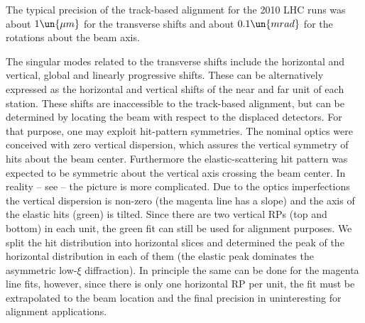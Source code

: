
The typical precision of the track-based alignment for the 2010 LHC runs was about $1\un{\mu m}$ for the transverse shifts and about $0.1\un{mrad}$ for the rotations about the beam axis.

The singular modes related to the transverse shifts include the horizontal and vertical, global and linearly progressive shifts. These can be alternatively expressed as the horizontal and vertical shifts of the near and far unit of each station. These shifts are inaccessible to the track-based alignment, but can be determined by locating the beam with respect to the displaced detectors. For that purpose, one may exploit hit-pattern symmetries. The nominal optics were conceived with zero vertical dispersion, which assures the vertical symmetry of hits about the beam center. Furthermore the elastic-scattering hit pattern was expected to be symmetric about the vertical axis crossing the beam center. In reality -- see  -- the picture is more complicated. Due to the optics imperfections the vertical dispersion is non-zero (the magenta line has a slope) and the axis of the elastic hits (green) is tilted. Since there are two vertical RPs (top and bottom) in each unit, the green fit can still be used for alignment purposes. We split the hit distribution into horizontal slices and determined the peak of the horizontal distribution in each of them (the elastic peak dominates the asymmetric low-$\xi$ diffraction). In principle the same can be done for the magenta line fits, however, since there is only one horizontal RP per unit, the fit must be extrapolated to the beam location and the final precision in uninteresting for alignment applications.


